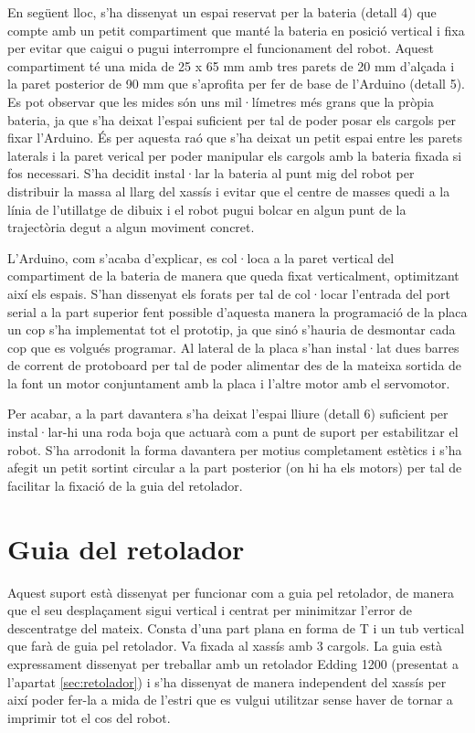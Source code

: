 En següent lloc, s’ha dissenyat un espai reservat per la bateria (detall 4) que compte amb un petit compartiment que manté la bateria en posició vertical i fixa per evitar que caigui o pugui interrompre el funcionament del robot. Aquest compartiment té una mida de 25 x 65 mm amb tres parets de 20 mm d’alçada i la paret posterior de 90 mm que s’aprofita per fer de base de l’Arduino (detall 5). Es pot observar que les mides són uns mil·límetres més grans que la pròpia bateria, ja que s’ha deixat l’espai suficient per tal de poder posar els cargols per fixar l’Arduino. És per aquesta raó que s’ha deixat un petit espai entre les parets laterals i la paret verical per poder manipular els cargols amb la bateria fixada si fos necessari. S’ha decidit instal·lar la bateria al punt mig del robot per distribuir la massa al llarg del xassís i evitar que el centre de masses quedi a la línia de l’utillatge de dibuix i el robot pugui bolcar en algun punt de la trajectòria degut a algun moviment concret.   

L’Arduino, com s’acaba d’explicar, es col·loca a la paret vertical del compartiment de la bateria de manera que queda fixat verticalment, optimitzant així els espais. S’han dissenyat els forats per tal de col·locar l’entrada del port serial a la part superior fent possible d’aquesta manera la programació de la placa un cop s’ha implementat tot el prototip, ja que sinó s'hauria de desmontar cada cop que es volgués programar. Al lateral de la placa s’han instal·lat dues barres de corrent de protoboard per tal de poder alimentar des de la mateixa sortida de la font un motor conjuntament amb la placa i l’altre motor amb el servomotor. 

Per acabar, a la part davantera s’ha deixat l’espai lliure (detall 6) suficient per instal·lar-hi una roda boja que actuarà com a punt de suport per estabilitzar el robot. S'ha arrodonit la forma davantera per motius completament estètics i s'ha afegit un petit sortint circular a la part posterior (on hi ha els motors) per tal de facilitar la fixació de la guia del retolador.

\section{Guia del retolador} \label{sec:guia}

Aquest suport està dissenyat per funcionar com a guia pel retolador, de manera que el seu desplaçament sigui vertical i centrat per minimitzar l’error de descentratge del mateix. Consta d’una part plana en forma de T i un tub vertical que farà de guia pel retolador. Va fixada al xassís amb 3 cargols. La guia està expressament dissenyat per treballar amb un retolador Edding 1200 (presentat a l’apartat \ref{sec:retolador}) i s’ha dissenyat de manera independent del xassís per així poder fer-la a mida de l’estri que es vulgui utilitzar sense haver de tornar a imprimir tot el cos del robot. 

